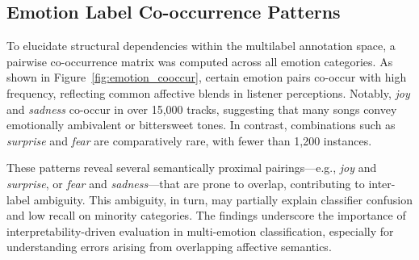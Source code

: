 \documentclass{article}
\begin{document}



\subsection{Emotion Label Co-occurrence Patterns}

To elucidate structural dependencies within the multilabel annotation space, a pairwise co-occurrence matrix was computed across all emotion categories. As shown in Figure~\ref{fig:emotion_cooccur}, certain emotion pairs co-occur with high frequency, reflecting common affective blends in listener perceptions. Notably, \textit{joy} and \textit{sadness} co-occur in over 15,000 tracks, suggesting that many songs convey emotionally ambivalent or bittersweet tones. In contrast, combinations such as \textit{surprise} and \textit{fear} are comparatively rare, with fewer than 1,200 instances.

These patterns reveal several semantically proximal pairings—e.g., \textit{joy} and \textit{surprise}, or \textit{fear} and \textit{sadness}—that are prone to overlap, contributing to inter-label ambiguity. This ambiguity, in turn, may partially explain classifier confusion and low recall on minority categories. The findings underscore the importance of interpretability-driven evaluation in multi-emotion classification, especially for understanding errors arising from overlapping affective semantics.
\end{document}
